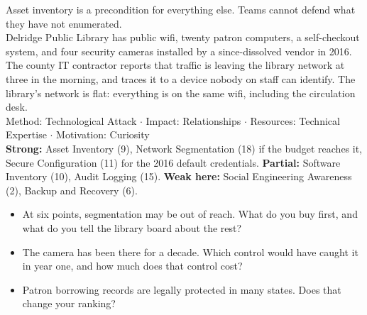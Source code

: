  Asset inventory is a precondition for everything else.
Teams cannot defend what they have not enumerated.\\
 Delridge Public Library has public wifi, twenty patron
computers, a self-checkout system, and four security cameras installed by a
since-dissolved vendor in 2016. The county IT contractor reports that traffic is
leaving the library network at three in the morning, and traces it to a device
nobody on staff can identify. The library's network is flat: everything is on
the same wifi, including the circulation desk.\\
 Method: Technological Attack $\cdot$ Impact: Relationships
$\cdot$ Resources: Technical Expertise $\cdot$ Motivation: Curiosity\\
 \textbf{Strong:} Asset Inventory (9), Network Segmentation (18)
if the budget reaches it, Secure Configuration (11) for the 2016 default
credentials. \textbf{Partial:} Software Inventory (10), Audit Logging (15).
\textbf{Weak here:} Social Engineering Awareness (2), Backup and Recovery (6).\\
\begin{itemize}
\item At six points, segmentation may be out of reach. What do you buy first, and
what do you tell the library board about the rest?
\item The camera has been there for a decade. Which control would have caught it
in year one, and how much does that control cost?
\item Patron borrowing records are legally protected in many states. Does that
change your ranking?
\end{itemize}

